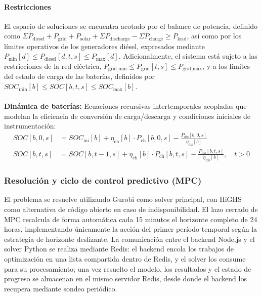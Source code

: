 \documentclass[journal,article,submit,pdftex,moreauthors]{Definitions/mdpi}
\begin{document}
\paragraph{Restricciones}
El espacio de soluciones se encuentra acotado por el balance de potencia, definido como $\Sigma P_{\text{diesel}} + P_{\text{grid}} + P_{\text{solar}} + \Sigma P_{\text{discharge}} - \Sigma P_{\text{charge}} \ge P_{\text{load}}$, así como por los límites operativos de los generadores diésel, expresados mediante $P_{\text{min}}[d] \le P_{\text{diesel}}[d,t,s] \le P_{\text{max}}[d]$. Adicionalmente, el sistema está sujeto a las restricciones de la red eléctrica, $P_{\text{grid\_min}} \le P_{\text{grid}}[t,s] \le P_{\text{grid\_max}}$, y a los límites del estado de carga de las baterías, definidos por $SOC_{\text{min}}[b] \le SOC[b,t,s] \le SOC_{\text{max}}[b]$.
\\\\    
\textbf{Din\'amica de bater\'ias:} Ecuaciones recursivas intertemporales acopladas que modelan la eficiencia de conversi\'on de carga/descarga y condiciones iniciales de instrumentaci\'on:
    \begin{align}
        SOC[b,0,s] &= SOC_{\text{ini}}[b] + \eta_{\text{ch}}[b] \cdot P_{\text{ch}}[b,0,s] - \frac{P_{\text{dis}}[b,0,s]}{\eta_{\text{dis}}[b]} \\
        SOC[b,t,s] &= SOC[b,t-1,s] + \eta_{\text{ch}}[b] \cdot P_{\text{ch}}[b,t,s] - \frac{P_{\text{dis}}[b,t,s]}{\eta_{\text{dis}}[b]}, \quad t > 0
    \end{align}



\subsubsection{Resoluci\'on y ciclo de control predictivo (MPC)}
El problema se resuelve utilizando Gurobi como solver principal, con HiGHS como alternativa de código abierto en caso de indisponibilidad. El lazo cerrado de MPC recalcula de forma automática cada 15 minutos el horizonte completo de 24 horas, implementando únicamente la acción del primer período temporal según la estrategia de horizonte deslizante. La comunicación entre el backend Node.js y el solver Python se realiza mediante Redis: el backend encola los trabajos de optimización en una lista compartida dentro de Redis, y el solver los consume para su procesamiento; una vez resuelto el modelo, los resultados y el estado de progreso se almacenan en el mismo servidor Redis, desde donde el backend los recupera mediante sondeo periódico.
\end{document}
